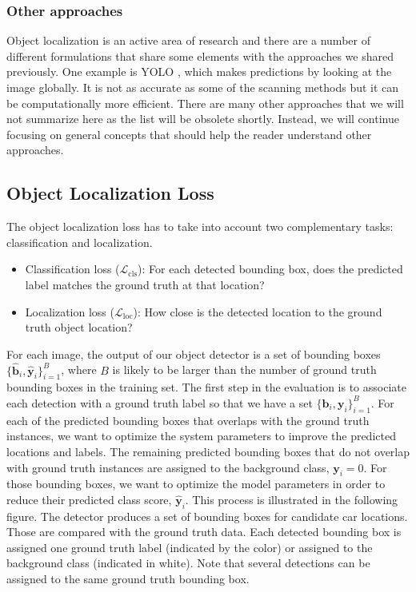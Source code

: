 \subsubsection{Other approaches}
Object localization is an active area of research and there are a number of different formulations that share some elements with the approaches we shared previously. One example is YOLO \cite{Redmon2016}, which makes predictions by looking at the image globally. It is not as accurate as some of the scanning methods but it can be computationally more efficient. There are many other approaches that we will not summarize here as the list will be obsolete shortly. Instead, we will continue focusing on general concepts that should help the reader understand other approaches.

\subsection{Object Localization Loss}

The object localization loss has to take into account two complementary tasks: classification and localization.
\begin{itemize}
\item Classification loss ($\mathcal{L}_{\text{cls}}$): For each detected bounding box, does the predicted label matches the ground truth at that location? 
\item Localization loss ($\mathcal{L}_{\text{loc}}$): How close is the detected location to the ground truth object location?
\end{itemize}

For each image, the output of our object detector is a set of bounding boxes $\{\hat{\mathbf{b}}_i, \hat{\mathbf{y}}_i\}_{i=1}^B$, where $B$ is likely to be larger than the number of ground truth bounding boxes in the training set. The first step in the evaluation is to associate each detection with a ground truth label so that we have a set $\{\mathbf{b}_i, \mathbf{y}_i\}_{i=1}^B$. For each of the predicted bounding boxes that overlaps with the ground truth instances, we want to optimize the system parameters to improve the predicted locations and labels. The remaining predicted bounding boxes that do not overlap with ground truth instances are assigned to the background class, $\mathbf{y}_i=0$. For those bounding boxes, we want to optimize the model parameters in order to reduce their predicted class score, $\hat{\mathbf{y}}_i$. This process is illustrated in the following figure. The detector produces a set of bounding boxes for candidate car locations. Those are compared with the ground truth data. Each detected bounding box is assigned one ground truth label (indicated by the color) or assigned to the background class (indicated in white). Note that several detections can be assigned to the same ground truth bounding box. 

